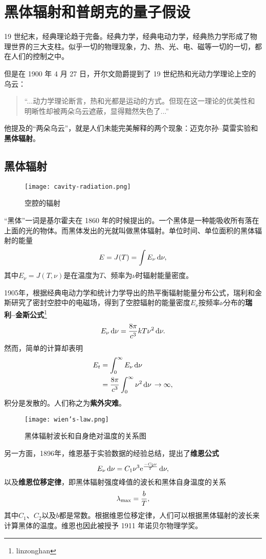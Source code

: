 
\section{黑体辐射和普朗克的量子假设}
19 世纪末，经典理论趋于完备。经典力学，经典电动力学，经典热力学形成了物理世界的三大支柱。似乎一切的物理现象，力、热、光、电、磁等一切的一切，都在人们的控制之中。

但是在 1900 年 4 月 27 日，开尔文勋爵提到了 19 世纪热和光动力学理论上空的乌云：
\begin{quote}\kaishu
	“...动力学理论断言，热和光都是运动的方式。但现在这一理论的优美性和明晰性却被两朵乌云遮蔽，显得黯然失色了...”
\end{quote}
他提及的“两朵乌云”，就是人们未能完美解释的两个现象：迈克尔孙--莫雷实验和\textbf{黑体辐射}。

\subsection{黑体辐射}
\begin{figure}[H]
    \centering
    \texttt{[image: cavity-radiation.png]}
    \caption{空腔的辐射}
\end{figure}
“黑体”一词是基尔霍夫在 1860 年的时候提出的。一个黑体是一种能吸收所有落在上面的光的物体。而黑体发出的光就叫做黑体辐射。单位时间、单位面积的黑体辐射的能量
\begin{equation}
	E=J(T)=\int E_\nu\, \mathrm{d}\nu,
\end{equation}
其中$E_\nu=J(T,\nu)$是在温度为$T$、频率为$\nu$时辐射能量密度。

1905年，根据经典电动力学和统计力学导出的热平衡辐射能量分布公式，瑞利和金斯研究了密封空腔中的电磁场，得到了空腔辐射的能量密度$E_\nu$按频率$\nu$分布的\textbf{瑞利--金斯公式}\footnote{linzonghan}
\begin{equation}
	E_\nu\,\mathrm{d}\nu =\frac{8\pi}{c^3}kT\nu^2\,\mathrm{d}\nu.
\end{equation}
然而，简单的计算却表明
\begin{align}
    E_t
    &=\int^{\infty}_{0} E_\nu \, \mathrm{d}\nu \notag\\
    &=\frac{8\pi}{c^3}\int^{\infty}_{0}\nu^2\, \mathrm{d}\nu\, \to \infty,
\end{align}
积分是发散的。人们称之为\textbf{紫外灾难}。

\begin{figure}
	\centering
	\texttt{[image: wien's-law.png]}
	\caption{黑体辐射波长和自身绝对温度的关系图}
\end{figure}
另一方面，1896年，维恩基于实验数据的经验总结，提出了\textbf{维恩公式}
\begin{equation}
	E_\nu\, \mathrm{d}\nu
	=C_1\nu^3 \mathrm{e}^\frac{-C_2\nu}{T} \, \mathrm{d}\nu,
\end{equation}
以及\textbf{维恩位移定律}，即黑体辐射强度峰值的波长和黑体自身温度的关系
\begin{equation}
	\lambda_{\mathrm{max}}=\frac{b}{T},
\end{equation}
其中$C_1$、$C_2$以及$b$都是常数。根据维恩位移定律，人们可以根据黑体辐射的波长来计算黑体的温度。维恩也因此被授予 1911 年诺贝尔物理学奖。

